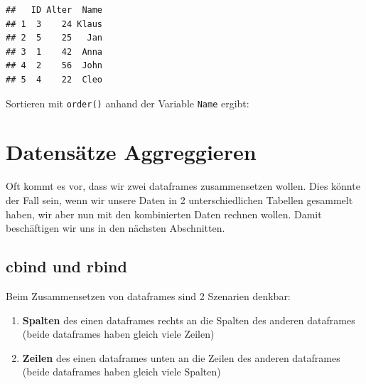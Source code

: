 \documentclass[
]{book}
\newenvironment{Shaded}{\begin{snugshade}}{\end{snugshade}}
\newcommand{\FunctionTok}[1]{\textcolor[rgb]{0.00,0.00,0.00}{#1}}
\newcommand{\NormalTok}[1]{#1}
\newcommand{\OtherTok}[1]{\textcolor[rgb]{0.56,0.35,0.01}{#1}}
\newcommand{\SpecialCharTok}[1]{\textcolor[rgb]{0.00,0.00,0.00}{#1}}
\newcommand{\StringTok}[1]{\textcolor[rgb]{0.31,0.60,0.02}{#1}}
\providecommand{\tightlist}{%
  \setlength{\itemsep}{0pt}\setlength{\parskip}{0pt}}
\begin{document}
\begin{Shaded}
\end{Shaded}

\begin{verbatim}
##   ID Alter  Name
## 1  3    24 Klaus
## 2  5    25   Jan
## 3  1    42  Anna
## 4  2    56  John
## 5  4    22  Cleo
\end{verbatim}

Sortieren mit \texttt{order()} anhand der Variable \texttt{Name} ergibt:

\begin{Shaded}
\end{Shaded}

\hypertarget{datensuxe4tze-aggreggieren}{%
\section{Datensätze Aggreggieren}\label{datensuxe4tze-aggreggieren}}

Oft kommt es vor, dass wir zwei dataframes zusammensetzen wollen. Dies könnte der Fall sein, wenn wir unsere Daten in 2 unterschiedlichen Tabellen gesammelt haben, wir aber nun mit den kombinierten Daten rechnen wollen. Damit beschäftigen wir uns in den nächsten Abschnitten.

\hypertarget{cbind-und-rbind}{%
\subsection{cbind und rbind}\label{cbind-und-rbind}}

Beim Zusammensetzen von dataframes sind 2 Szenarien denkbar:

\begin{enumerate}
\def\labelenumi{\arabic{enumi}.}
\tightlist
\item
  \textbf{Spalten} des einen dataframes rechts an die Spalten des anderen dataframes (beide dataframes haben gleich viele Zeilen)
\item
  \textbf{Zeilen} des einen dataframes unten an die Zeilen des anderen dataframes (beide dataframes haben gleich viele Spalten)
\end{enumerate}
\end{document}
